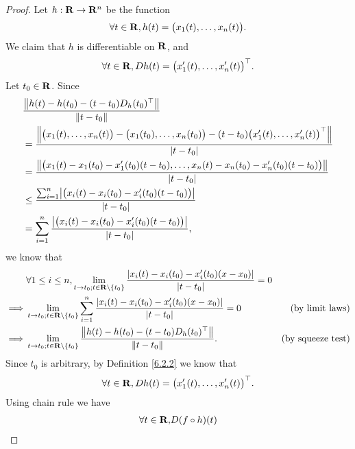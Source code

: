 \begin{proof}
    Let \(h : \R \to \R^n\) be the function
    \[
        \forall t \in \R, h(t) = \big(x_1(t), \dots, x_n(t)\big).
    \]
    We claim that \(h\) is differentiable on \(\R\), and
    \[
        \forall t \in \R, D h(t) = \big(x_1'(t), \dots, x_n'(t)\big)^\top.
    \]
    Let \(t_0 \in \R\).
    Since
    \begin{align*}
         & \frac{\norm*{h(t) - h(t_0) - (t - t_0) D_h(t_0)^\top}}{\norm*{t - t_0}}                                                                                  \\
         & = \frac{\norm*{\big(x_1(t), \dots, x_n(t)\big) - \big(x_1(t_0), \dots, x_n(t_0)\big) - (t - t_0) \big(x_1'(t), \dots, x_n'(t)\big)^\top}}{\abs{t - t_0}} \\
         & = \frac{\norm*{\big(x_1(t) - x_1(t_0) - x_1'(t_0)(t - t_0), \dots, x_n(t) - x_n(t_0) - x_n'(t_0)(t - t_0)\big)}}{\abs{t - t_0}}                          \\
         & \leq \frac{\sum_{i = 1}^n \abs{\big(x_i(t) - x_i(t_0) - x_i'(t_0)(t - t_0)\big)}}{\abs{t - t_0}}                                                         \\
         & = \sum_{i = 1}^n \frac{\abs{\big(x_i(t) - x_i(t_0) - x_i'(t_0)(t - t_0)\big)}}{\abs{t - t_0}},
    \end{align*}
    we know that
    \begin{align*}
                 & \forall 1 \leq i \leq n, \lim_{t \to t_0 ; t \in \R \setminus \{t_0\}} \frac{\abs{x_i(t) - x_i(t_0) - x_i'(t_0)(x - x_0)}}{\abs{t - t_0}} = 0                            \\
        \implies & \lim_{t \to t_0 ; t \in \R \setminus \{t_0\}} \sum_{i = 1}^n \frac{\abs{x_i(t) - x_i(t_0) - x_i'(t_0)(x - x_0)}}{\abs{t - t_0}} = 0           & \text{(by limit laws)}   \\
        \implies & \lim_{t \to t_0 ; t \in \R \setminus \{t_0\}} \frac{\norm*{h(t) - h(t_0) - (t - t_0) D_h(t_0)^\top}}{\norm*{t - t_0}}.                        & \text{(by squeeze test)}
    \end{align*}
    Since \(t_0\) is arbitrary, by Definition \ref{6.2.2} we know that
    \[
        \forall t \in \R, D h(t) = \big(x_1'(t), \dots, x_n'(t)\big)^\top.
    \]
    Using chain rule we have
    \begin{align*}
        \forall t \in \R, & D (f \circ h)(t)                                                                                                                           \\

\end{align*}
\end{proof}
